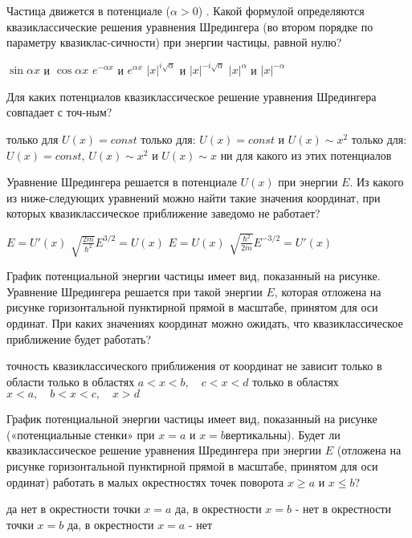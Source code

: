 \documentclass[11pt,a4paper]{exam}
\begin{document}
\begin{questions}
\question Частица движется в потенциале   ($\alpha  > 0$) . Какой формулой определяются квазиклассические решения уравнения Шредингера (во втором порядке по параметру квазиклас-сичности) при энергии частицы, равной нулю?
\begin{choices}
\choice $\sin \alpha x$ и $\cos \alpha x$     
\choice ${e^{ - \alpha x}}$ и ${e^{\alpha x}}$      
\choice $|x{|^{i\sqrt \alpha  }}$ и $|x{|^{ - i\sqrt \alpha  }}$      
\choice $|x{|^\alpha }$ и $|x{|^{ - \alpha }}$
\end{choices}

\question Для каких потенциалов квазиклассическое решение уравнения Шредингера совпадает с точ-ным?
\begin{choices}
\choice только для $U(x) = const$
\choice только для: $U(x) = const$ и $U(x) \sim {x^2}$
\choice только для:$U(x) = const$, $U(x) \sim {x^2}$ и $U(x) \sim x$
\choice ни для какого из этих потенциалов
\end{choices}

\question Уравнение Шредингера решается в потенциале $U(x)$ при энергии $E$. Из какого из ниже-следующих уравнений можно найти такие значения координат, при которых квазиклассическое приближение заведомо не работает?
\begin{choices}
\choice $E = U'(x)$    
\choice $\sqrt {\frac{{2m}}{{{\hbar ^2}}}} {E^{3/2}} = U(x)$     
\choice $E = U(x)$     
\choice $\sqrt {\frac{{{\hbar ^2}}}{{2m}}} {E^{ - 3/2}} = U'(x)$
\end{choices}

\question График потенциальной энергии частицы имеет вид, показанный на рисунке. Уравнение Шредингера решается при такой энергии $E$, которая отложена на рисунке горизонтальной пунктирной прямой в масштабе, принятом для оси ординат. При каких значениях координат можно ожидать, что квазиклассическое приближение будет работать?
\begin{choices}
\choice точность квазиклассического приближения от координат не зависит
\choice только в области 
\choice только в областях $a < x < b,\quad c < x < d$
\choice только в областях $x < a,\quad b < x < c,\quad x > d$
\end{choices}

\question График потенциальной энергии частицы имеет вид, показанный на рисунке («потенциальные стенки» при $x = a$ и $x = b$вертикальны). Будет ли квазиклассическое решение уравнения Шредингера при энергии $E$ (отложена на рисунке горизонтальной пунктирной прямой в масштабе, принятом для оси ординат) работать в малых окрестностях точек поворота $x \ge a$ и $x \le b$?
\begin{choices}
\choice да
\choice нет
\choice в окрестности точки $x = a$ да, в окрестности $x = b$ - нет
\choice в окрестности точки $x = b$ да, в окрестности $x = a$ - нет
\end{choices}


\end{questions}
\end{document}
